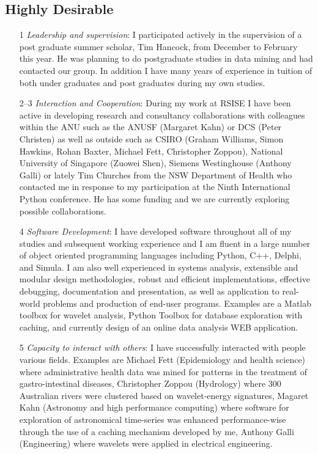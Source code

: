 \documentclass[12pt,a4paper]{article}
\begin{document}
\subsection*{Highly Desirable}

\begin{itemize}
  \item[1] \textit{Leadership and supervision}:
  I participated actively in the supervision of a post graduate 
  summer scholar, Tim Hancock, from December to February this year.
  He was planning to do postgraduate studies in data mining and had 
  contacted our group.
  In addition I have many years of experience in tuition of both 
  under graduates and post graduates during my own studies.
  \item[2--3] \textit{Interaction and Cooperation}: 
  During my work at RSISE I have been active in 
  developing research and consultancy collaborations with colleagues 
  within the ANU such as the ANUSF (Margaret Kahn) or DCS (Peter Christen) 
  as well as outside such as 
  CSIRO (Graham Williams, Simon Hawkins, Rohan Baxter, 
  Michael Fett, Christopher Zoppou), 
  National University of Singapore (Zuowei Shen), 
  Siemens Westinghouse (Anthony Galli)
  or lately Tim Churches from the NSW Department of Health who 
  contacted me in response to my participation at the Ninth International 
  Python conference. He has some funding and we are currently exploring 
  possible collaborations.~\label{ref:Tim}
  \item[4] \textit{Software Development}: 
  I have developed software throughout all of my studies and
  subsequent working experience and I am fluent in a large number of 
  object oriented programming languages including
  Python, C++, Delphi, and Simula. 
  I am also well experienced in 
  systems analysis, extensible and modular design methodologies, 
  robust and efficient implementations, effective debugging, 
  documentation and presentation, as well as application to real-world
  problems and production of end-user programs.
  Examples are a Matlab toolbox for wavelet analysis, 
  Python Toolbox for database exploration with caching, and currently
  design of an online data analysis WEB application.
  \item[5] \textit{Capacity to interact with others}:
  I have successfully interacted with people various fields.
  Examples are Michael Fett (Epidemiology and health science)
  where administrative health data was mined for patterns in the 
  treatment of gastro-intestinal diseases, 
  Christopher Zoppou (Hydrology) where 300 Australian rivers were 
  clustered based on wavelet-energy signatures,
  Magaret Kahn (Astronomy and high performance computing)
  where software for exploration of astronomical time-series was enhanced
  performance-wise through the use of a caching mechanism developed by me,
  Anthony Galli (Engineering) where wavelets were applied in 
  electrical engineering.
\end{itemize}
\end{document}
